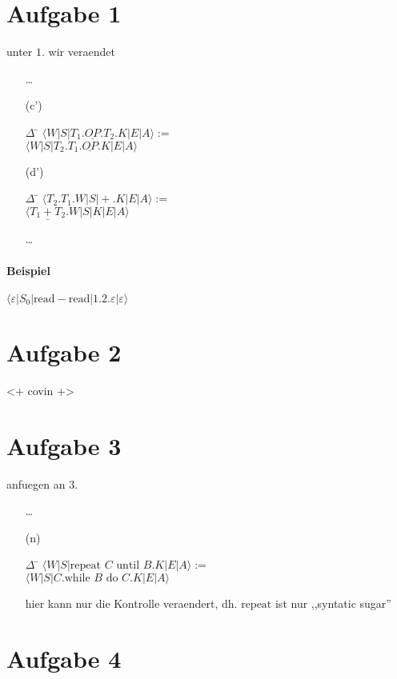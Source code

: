 



\newcommand{\op}{\underline{OP}}


\newcommand{\nr}{3}


\section*{Aufgabe 1}
unter $1.$ wir veraendet
\begin{enumerate}
\item[] \ldots
\item[(c')]
    \begin{tabbing}
    $\Delta$ \= $\langle W | S | T_1.\op.T_2.K | E | A \rangle :=$ \\
             \> $\langle W | S | T_2.T_1.\op.K | E | A \rangle$
    \end{tabbing}
\item[(d')]
    \begin{tabbing}
    $\Delta$ \= $\langle             T_2.T_1.W | S | +.K | E | A \rangle :=$ \\
             \> $\langle \underline{T_1+T_2}.W | S |   K | E | A \rangle$
    \end{tabbing}
\item[] \ldots
\end{enumerate}

\paragraph{Beispiel} $\langle \varepsilon | S_0 | \text{read} - \text{read} | 1.2.\varepsilon | \varepsilon \rangle$

\section*{Aufgabe 2}
<+ covin +>

\section*{Aufgabe 3}
anfuegen an $3.$
\begin{enumerate}
\item[] \ldots
\item[(n)]
    \begin{tabbing}
    $\Delta$ \= $\langle W | S | \text{repeat } C \text{ until } B.K | E | A \rangle :=$ \\
             \> $\langle W | S | C.\text{while }B \text{ do } C.K | E | A \rangle$
    \end{tabbing}
    hier kann nur die Kontrolle veraendert, dh. $\text{repeat}$ ist nur ,,syntatic sugar''
\end{enumerate}

\section*{Aufgabe 4}


